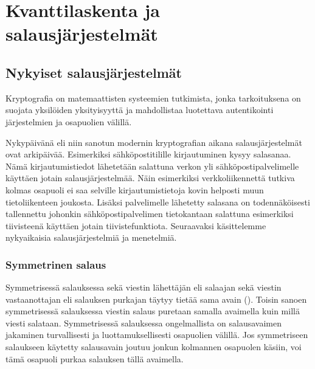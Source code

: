 \chapter{Kvanttilaskenta ja salausjärjestelmät\label{methods}}

\section{Nykyiset salausjärjestelmät}
Kryptografia on matemaattisten systeemien tutkimista, jonka tarkoituksena on suojata yksilöiden yksityisyyttä ja mahdollistaa luotettava autentikointi järjestelmien ja osapuolien välillä.

Nykypäivänä eli niin sanotun modernin kryptografian aikana salausjärjestelmät ovat arkipäivää. Esimerkiksi sähköpostitilille kirjautuminen kysyy salasanaa. Nämä kirjautumistiedot lähetetään salattuna verkon yli sähköpostipalvelimelle käyttäen jotain salausjärjestelmää. Näin esimerkiksi verkkoliikennettä tutkiva kolmas osapuoli ei saa selville kirjautumistietoja kovin helposti muun tietoliikenteen joukosta. Lisäksi palvelimelle lähetetty salasana on todennäköisesti tallennettu johonkin sähköpostipalvelimen tietokantaan salattuna esimerkiksi tiivisteenä käyttäen jotain tiivistefunktiota. Seuraavaksi käsittelemme nykyaikaisia salausjärjestelmiä ja menetelmiä.

\subsection{Symmetrinen salaus}
 Symmetrisessä salauksessa sekä viestin lähettäjän eli salaajan sekä viestin vastaanottajan eli salauksen purkajan täytyy tietää sama avain (\cite{bellare2005introduction}). Toisin sanoen symmetrisessä salauksessa viestin salaus puretaan samalla avaimella kuin millä viesti salataan.  Symmetrisessä salauksessa ongelmallista on salausavaimen jakaminen turvallisesti ja luottamuksellisesti osapuolien välillä. Jos symmetriseen salaukseen käytetty salausavain joutuu jonkun kolmannen osapuolen käsiin, voi tämä osapuoli purkaa salauksen tällä avaimella.
 
 
 
